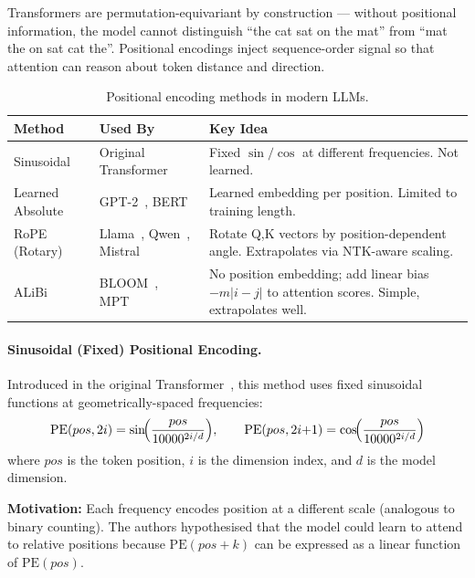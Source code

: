 Transformers are permutation-equivariant by construction --- without positional information, the model cannot distinguish ``the cat sat on the mat'' from ``mat the on sat cat the''. Positional encodings inject sequence-order signal so that attention can reason about token distance and direction.

\begin{table}[ht!]
\centering
\caption{Positional encoding methods in modern LLMs.}
\begin{tabular}{@{}lp{5cm}p{6.5cm}@{}}
\toprule
\textbf{Method} & \textbf{Used By} & \textbf{Key Idea} \\
\midrule
Sinusoidal & Original Transformer & Fixed $\sin/\cos$ at different frequencies. Not learned. \\
Learned Absolute & GPT-2~\cite{radford2019gpt2}, BERT~\cite{devlin2019bert} & Learned embedding per position. Limited to training length. \\
RoPE (Rotary) & Llama~\cite{grattafiori2024llama3}, Qwen~\cite{qwen2024qwen25}, Mistral~\cite{jiang2023mistral} & Rotate Q,K vectors by position-dependent angle. Extrapolates via NTK-aware scaling. \\
ALiBi & BLOOM~\cite{workshop2023bloom}, MPT~\cite{mosaicml2023mpt} & No position embedding; add linear bias $-m|i-j|$ to attention scores. Simple, extrapolates well. \\
\bottomrule
\end{tabular}
\end{table}

\paragraph{Sinusoidal (Fixed) Positional Encoding.}
\label{sinusoidal-fixed-positional-encoding.}

Introduced in the original Transformer~\cite{vaswani2017attention}, this method uses fixed sinusoidal functions at geometrically-spaced frequencies: 
\[
\text{PE}(pos, 2i) = \sin\!\Bigl(\frac{pos}{10000^{2i/d}}\Bigr), \qquad
  \text{PE}(pos, 2i{+}1) = \cos\!\Bigl(\frac{pos}{10000^{2i/d}}\Bigr)
\]
 where $pos$ is the token position, $i$ is the dimension index, and $d$ is the model dimension.

\textbf{Motivation:} Each frequency encodes position at a different scale (analogous to binary counting). The authors hypothesised that the model could learn to attend to relative positions because $\text{PE}(pos+k)$ can be expressed as a linear function of $\text{PE}(pos)$.


